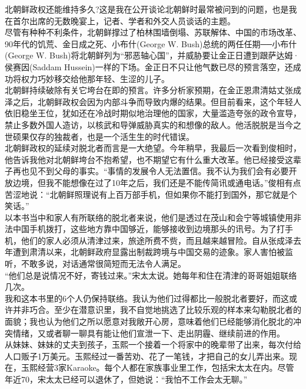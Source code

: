 北朝鲜政权还能维持多久?这是我在公开谈论北朝鲜时最常被问到的问题，也是我在首尔出席的无数晚宴上，记者、学者和外交人员谈话的主题。\\

尽管有种种不利条件，北朝鲜撑过了柏林围墙倒塌、苏联解体、中国的市场改革、90年代的饥荒、金日成之死、小布什(George W. Bush)总统的两任任期──小布什(George W. Bush)将北朝鲜列为“邪恶轴心国”，并威胁要让金正日遭到跟萨达姆·侯赛因(Saddam Hussein)一样的下场。金正日不只让他气数已尽的预言落空，还成功将权力巧妙移交给他那年轻、生涩的儿子。\\

北朝鲜持续破除有关它垮台在即的预言。许多分析家预期，在金正恩肃清姑丈张成泽之后，北朝鲜政权会因为内部斗争而导致内爆的结果。但目前看来，这个年轻人依旧稳坐王位，犹如还在冷战时期似地治理他的国家，大量滥造夸张的政令宣导，禁止多数外国人造访，以核武和导弹威胁真实的和想像的敌人。他活脱脱是当今之世硕果仅存的独裁者，也是一个活生生的时代错误。\\

北朝鲜政权的延续对脱北者而言是一大绝望。今年稍早，我最后一次看到俊相时，他告诉我他对北朝鲜垮台不抱希望，也不期望它有什么重大改革。他已经接受这辈子再也见不到父母的事实。“事情的发展令人无法置信。我不认为我们会有必要开放边境，但我不能想像在过了10年之后，我们还是不能传简讯或通电话。”俊相有点苦涩地说：“北朝鲜照理说有上百万部手机，但如果你不能打到国外，那它就是个笑话。”\\

以本书当中和家人有所联络的脱北者来说，他们是透过在茂山和会宁等城镇使用非法中国手机拨打，这些地方靠中国够近，能够接收到边境那头的讯号。为了打手机，他们的家人必须从清津过来，旅途所费不赀，而且越来越冒险。自从张成泽去年遭到肃清以来，北朝鲜政府显露出制裁跨境与中国交易的迹象。家人害怕被监听，不敢多说，对话通常很简短而无法令人满足。\\

“他们总是说情况不好，寄钱过来。”宋太太说。她每年和住在清津的哥哥姐姐联络几次。\\

我和这本书里的6个人仍保持联络。我认为他们过得都比一般脱北者要好，而这或许并非巧合。至少在潜意识里，我不自觉地挑选了比较乐观的样本来勾勒脱北者的面貌；我也认为他们之所以愿意对我敞开心房，意味着他们已经能够消化脱北的冲突情绪，又或者聊一聊具有能让他们宣泄一下、走出阴霾、继续前进的作用。\\

从妹妹、妹妹的丈夫到孩子，玉熙一个接着一个将家中的晚辈带了出来，每次付给人口贩子1万美元。玉熙经过一番苦劝、花了一笔钱，才把自己的女儿弄出来。现在，玉熙经营3家Karaoke。每个人都在家族事业里工作，包括宋太太在内。尽管年近70，宋太太已经可以退休了，但她说：“我怕不工作会太无聊。”\\

